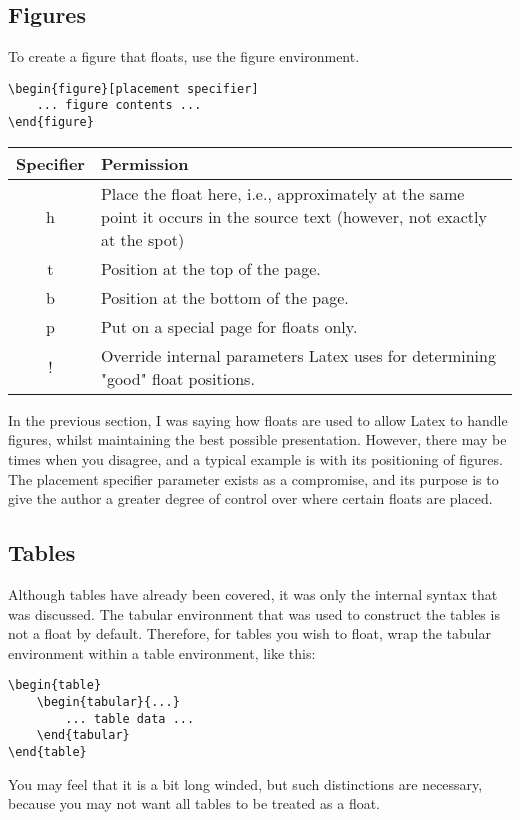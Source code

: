 \documentclass[a4paper, 12pt, oneside]{report}
\begin{document}
\subsection{Figures}
To create a figure that floats, use the figure environment.
\begin{verbatim}
\begin{figure}[placement specifier]
    ... figure contents ...
\end{figure}
\end{verbatim}
\begin{center}
	\begin{tabular}{|c|p{8cm}|}
		\hline
		Specifier	& Permission \\
		\hline
		h	& Place the float here, i.e., approximately at the same point it occurs in the source text (however, not exactly at the spot) \\
		\hline
		t	& Position at the top of the page. \\
		\hline
		b	& Position at the bottom of the page. \\
		\hline
		p	& Put on a special page for floats only. \\
		\hline
		!	& Override internal parameters Latex uses for determining "good" float positions. \\
		\hline
	\end{tabular}
\end{center}

In the previous section, I was saying how floats are used to allow Latex to handle figures, whilst maintaining the best possible presentation. However, there may be times when you disagree, and a typical example is with its positioning of figures. The placement specifier parameter exists as a compromise, and its purpose is to give the author a greater degree of control over where certain floats are placed.

\subsection{Tables}
Although tables have already been covered, it was only the internal syntax that was discussed. The tabular environment that was used to construct the tables is not a float by default. Therefore, for tables you wish to float, wrap the tabular environment within a table environment, like this:
\begin{verbatim}
\begin{table}
    \begin{tabular}{...}
        ... table data ...
    \end{tabular}
\end{table}
\end{verbatim}
You may feel that it is a bit long winded, but such distinctions are necessary, because you may not want all tables to be treated as a float.
\end{document}
